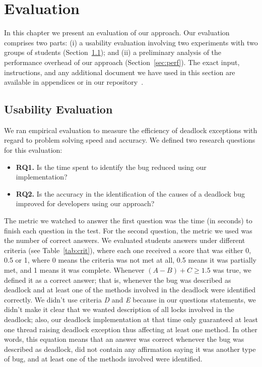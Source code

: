 \section{Evaluation}

In this chapter we present an evaluation of our approach. Our evaluation comprises two parts: (i) a usability evaluation involving two experiments with two groups of students (Section~\ref{sec:usab}); and (ii) a preliminary analysis of the performance overhead of our approach (Section~\ref{sec:perf}).  The exact input, instructions, and any additional document we have used in this section are available in appendices or in our repository~\cite{repo}.

\subsection{Usability Evaluation}\label{sec:usab}

We ran empirical evaluation to measure the efficiency of deadlock exceptions with regard to problem solving speed and accuracy. We defined two research questions for this evaluation: 

\begin{itemize}
\item {\bf RQ1.} Is the time spent to identify the bug reduced using our implementation?
\item {\bf RQ2.} Is the accuracy in the identification of the causes of a deadlock bug improved for developers using our approach?
\end{itemize}

The metric we watched to answer the first question was the time (in seconds) to finish each question in the test. For the second question, the metric we used was the number of correct answers. We evaluated students answers under different criteria (see Table~\ref{tab:crit}), where each one received a score that was either 0, 0.5 or 1, where 0 means the criteria was not met at all, 0.5 means it was partially met, and 1 means it was complete. Whenever $(A - B) + C \geq 1.5$ was true, we defined it as a correct answer; that is, whenever the bug was described as deadlock and at least one of the methods involved in the deadlock were identified correctly. We didn't use criteria \emph{D} and \emph{E} because in our questions statements, we didn't make it clear that we wanted description of all locks involved in the deadlock; also, our deadlock implementation at that time only guaranteed at least one thread raising deadlock exception thus affecting at least one method. In other words, this equation means that an answer was correct whenever the bug was described as deadlock, did not contain any affirmation saying it was another type of bug, and at least one of the methods involved were identified.

